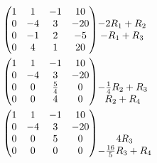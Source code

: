 \documentclass[12pt]{article}
\newenvironment{problem}[2][Problem]
{
	\begin{trivlist} 
		\item[\hskip \labelsep {\bfseries #1 #2:}]
	}
{
	\end{trivlist}
	}
\begin{document}
\begin{problem}{6}
\begin{align*}
%
%
%
\begin{pmatrix} 1&1&-1&10\\0&-4&3&-20\\0&-1&2&-5\\0&4&1&20\end{pmatrix}
&\begin{matrix} 
\hphantom{1}\\
-2R_1+R_2
\hphantom{1}\\
-R_1+R_3
\hphantom{1}\\
\hphantom{1}
\end{matrix}\\
%
%
%
\begin{pmatrix} 1&1&-1&10\\0&-4&3&-20\\0&0&\frac{5}{4}&0\\0&0&4&0\end{pmatrix}
&\begin{matrix} 
\hphantom{1}\\
\hphantom{1}\\
-\frac{1}{4}R_2+R_3
\hphantom{1}\\
R_2+R_4
\hphantom{1}
\end{matrix}\\
%
%
%
\begin{pmatrix} 1&1&-1&10\\0&-4&3&-20\\0&0&5&0\\0&0&0&0\end{pmatrix}
&\begin{matrix} 
\hphantom{1}\\
\hphantom{1}\\
4R_3
\hphantom{1}\\
-\frac{16}{5}R_3+R_4
\hphantom{1}
\end{matrix}\\
\end{align*}

\end{problem}
\end{document}
